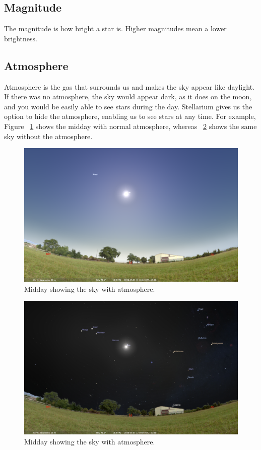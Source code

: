 \subsection{Magnitude}
The magnitude is how bright a star is. Higher magnitudes mean a lower brightness.

\subsection{Atmosphere}
Atmosphere is the gas that surrounds us and makes the sky appear like daylight. If there was no atmosphere, the sky would appear dark, as it does on the moon, and you would be easily able to see stars during the day. Stellarium gives us the option to hide the atmosphere, enabling us to see stars at any time. For example, Figure ~\ref{fig_with-atmosphere} shows the midday with normal atmosphere, whereas ~\ref{fig_no-atmosphere} shows the same sky without the atmosphere.

\begin{figure}[ht]
	\centerline{\includegraphics[width=1\columnwidth]{with-atmosphere.png}}
	\caption{\label{fig_with-atmosphere}{Midday showing the sky with atmosphere.}}
\end{figure}

\begin{figure}[ht]
	\centerline{\includegraphics[width=1\columnwidth]{no-atmosphere.png}}
	\caption{\label{fig_no-atmosphere}{Midday showing the sky with atmosphere.}}
\end{figure}


